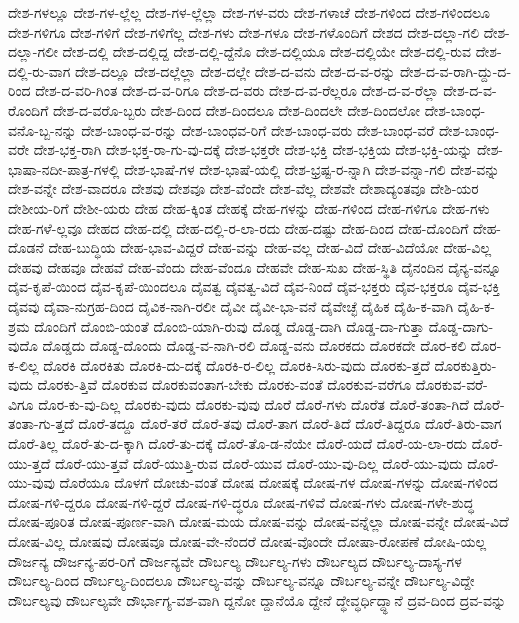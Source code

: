 {ದೇಶ-ಗಳಲ್ಲೂ
ದೇಶ-ಗಳ-ಲ್ಲೆಲ್ಲ
ದೇಶ-ಗಳ-ಲ್ಲೆಲ್ಲಾ
ದೇಶ-ಗಳ-ವರು
ದೇಶ-ಗಳಾಚೆ
ದೇಶ-ಗಳಿಂದ
ದೇಶ-ಗಳಿಂದಲೂ
ದೇಶ-ಗಳಿಗೂ
ದೇಶ-ಗಳಿಗೆ
ದೇಶ-ಗಳಿಗೆಲ್ಲ
ದೇಶ-ಗಳು
ದೇಶ-ಗಳೂ
ದೇಶ-ಗಳೊಂದಿಗೆ
ದೇಶದ
ದೇಶ-ದಲ್ಲಾ-ಗಲಿ
ದೇಶ-ದಲ್ಲಾ-ಗಲೀ
ದೇಶ-ದಲ್ಲಿ
ದೇಶ-ದಲ್ಲಿದ್ದ
ದೇಶ-ದಲ್ಲಿ-ದ್ದೆನೊ
ದೇಶ-ದಲ್ಲಿಯೂ
ದೇಶ-ದಲ್ಲಿಯೇ
ದೇಶ-ದಲ್ಲಿ-ರುವ
ದೇಶ-ದಲ್ಲಿ-ರು-ವಾಗ
ದೇಶ-ದಲ್ಲೂ
ದೇಶ-ದಲ್ಲೆಲ್ಲಾ
ದೇಶ-ದಲ್ಲೇ
ದೇಶ-ದ-ವನು
ದೇಶ-ದ-ವ-ರನ್ನು
ದೇಶ-ದ-ವ-ರಾಗಿ-ದ್ದು-ದ-ರಿಂದ
ದೇಶ-ದ-ವರಿ-ಗಿಂತ
ದೇಶ-ದ-ವ-ರಿಗೂ
ದೇಶ-ದ-ವರು
ದೇಶ-ದ-ವ-ರೆಲ್ಲರೂ
ದೇಶ-ದ-ವ-ರೆಲ್ಲಾ
ದೇಶ-ದ-ವ-ರೊಂದಿಗೆ
ದೇಶ-ದ-ವರೊ-ಬ್ಬರು
ದೇಶ-ದಿಂದ
ದೇಶ-ದಿಂದಲೂ
ದೇಶ-ದಿಂದಲೇ
ದೇಶ-ದಿಂದಲೋ
ದೇಶ-ಬಾಂಧ-ವನೊ-ಬ್ಬ-ನನ್ನು
ದೇಶ-ಬಾಂಧ-ವ-ರನ್ನು
ದೇಶ-ಬಾಂಧವ-ರಿಗೆ
ದೇಶ-ಬಾಂಧ-ವರು
ದೇಶ-ಬಾಂಧ-ವರೆ
ದೇಶ-ಬಾಂಧ-ವರೇ
ದೇಶ-ಭಕ್ತ-ರಾಗಿ
ದೇಶ-ಭಕ್ತ-ರಾ-ಗು-ವು-ದಕ್ಕೆ
ದೇಶ-ಭಕ್ತರೇ
ದೇಶ-ಭಕ್ತಿ
ದೇಶ-ಭಕ್ತಿಯ
ದೇಶ-ಭಕ್ತಿ-ಯನ್ನು
ದೇಶ-ಭಾಷಾ-ನದೀ-ಪಾತ್ರ-ಗಳಲ್ಲಿ
ದೇಶ-ಭಾಷೆ-ಗಳ
ದೇಶ-ಭಾಷೆ-ಯಲ್ಲಿ
ದೇಶ-ಭ್ರಷ್ಟ-ರ-ನ್ನಾಗಿ
ದೇಶ-ವನ್ನಾ-ಗಲಿ
ದೇಶ-ವನ್ನು
ದೇಶ-ವನ್ನೇ
ದೇಶ-ವಾದರೂ
ದೇಶವು
ದೇಶವೂ
ದೇಶ-ವೆಂದೇ
ದೇಶ-ವೆಲ್ಲ
ದೇಶವೇ
ದೇಶಾದ್ಯಂತವೂ
ದೇಶಿ-ಯರ
ದೇಶೀಯ-ರಿಗೆ
ದೇಶೀ-ಯರು
ದೇಹ
ದೇಹ-ಕ್ಕಿಂತ
ದೇಹಕ್ಕೆ
ದೇಹ-ಗಳನ್ನು
ದೇಹ-ಗಳಿಂದ
ದೇಹ-ಗಳಿಗೂ
ದೇಹ-ಗಳು
ದೇಹ-ಗಳೆ-ಲ್ಲವೂ
ದೇಹದ
ದೇಹ-ದಲ್ಲಿ
ದೇಹ-ದಲ್ಲಿ-ರ-ಲಾ-ರದು
ದೇಹ-ದಷ್ಟು
ದೇಹ-ದಿಂದ
ದೇಹ-ದೊಂದಿಗೆ
ದೇಹ-ದೊಡನೆ
ದೇಹ-ಬುದ್ಧಿಯ
ದೇಹ-ಭಾವ-ವಿದ್ದರೆ
ದೇಹ-ವನ್ನು
ದೇಹ-ವಲ್ಲ
ದೇಹ-ವಿದೆ
ದೇಹ-ವಿದೆಯೋ
ದೇಹ-ವಿಲ್ಲ
ದೇಹವು
ದೇಹವೂ
ದೇಹವೆ
ದೇಹ-ವೆಂದು
ದೇಹ-ವೆಂದೂ
ದೇಹವೇ
ದೇಹ-ಸುಖ
ದೇಹ-ಸ್ಥಿತಿ
ದೈನಂದಿನ
ದೈನ್ಯ-ವನ್ನೂ
ದೈವ-ಕೃಪೆ-ಯಿಂದ
ದೈವ-ಕೃಪೆ-ಯಿಂದಲೂ
ದೈವತ್ವ
ದೈವತ್ವ-ವಿದೆ
ದೈವ-ನಿಂದೆ
ದೈವ-ಭಕ್ತರು
ದೈವ-ಭಕ್ತರೂ
ದೈವ-ಭಕ್ತಿ
ದೈವವು
ದೈವಾ-ನುಗ್ರಹ-ದಿಂದ
ದೈವಿಕ-ನಾಗಿ-ರಲೀ
ದೈವೀ
ದೈವೀ-ಭಾ-ವನೆ
ದೈವೇಚ್ಛೆ
ದೈಹಿಕ
ದೈಹಿ-ಕ-ವಾಗಿ
ದೈಹಿ-ಕ-ಶ್ರಮ
ದೊಂದಿಗೆ
ದೊಂಬಿ-ಯಂತೆ
ದೊಂಬಿ-ಯಾಗಿ-ರುವು
ದೊಡ್ಡ
ದೊಡ್ಡ-ದಾಗಿ
ದೊಡ್ಡ-ದಾ-ಗುತ್ತಾ
ದೊಡ್ಡ-ದಾಗು-ವುದೊ
ದೊಡ್ಡದು
ದೊಡ್ಡ-ದೊಂದು
ದೊಡ್ಡ-ವ-ನಾಗಿ-ರಲಿ
ದೊಡ್ಡ-ವನು
ದೊರಕದು
ದೊರಕದೇ
ದೊರ-ಕಲಿ
ದೊರ-ಕ-ಲಿಲ್ಲ
ದೊರಕಿ
ದೊರಕಿತು
ದೊರಕಿ-ದು-ದಕ್ಕೆ
ದೊರಕಿ-ರ-ಲಿಲ್ಲ
ದೊರಕಿ-ಸಿರು-ವುದು
ದೊರಕು-ತ್ತದೆ
ದೊರಕುತ್ತಿರು-ವುದು
ದೊರಕು-ತ್ತಿವೆ
ದೊರಕುವ
ದೊರಕುವಂತಾಗ-ಬೇಕು
ದೊರಕು-ವಂತೆ
ದೊರಕುವ-ವರೆಗೂ
ದೊರಕುವ-ವರೆ-ವಿಗೂ
ದೊರ-ಕು-ವು-ದಿಲ್ಲ
ದೊರಕು-ವುದು
ದೊರಕು-ವುವು
ದೊರೆ
ದೊರೆ-ಗಳು
ದೊರೆತ
ದೊರೆ-ತಂತಾ-ಗಿದೆ
ದೊರೆ-ತಂತಾ-ಗು-ತ್ತದೆ
ದೊರೆ-ತದ್ದೂ
ದೊರೆ-ತರೆ
ದೊರೆ-ತವು
ದೊರೆ-ತಾಗ
ದೊರೆ-ತಿದೆ
ದೊರೆ-ತಿದ್ದರೂ
ದೊರೆ-ತಿರು-ವಾಗ
ದೊರೆ-ತಿಲ್ಲ
ದೊರೆ-ತು-ದ-ಕ್ಕಾಗಿ
ದೊರೆ-ತು-ದಕ್ಕೆ
ದೊರೆ-ತೊ-ಡ-ನೆಯೇ
ದೊರೆ-ಯದೆ
ದೊರೆ-ಯ-ಲಾ-ರದು
ದೊರೆ-ಯು-ತ್ತದೆ
ದೊರೆ-ಯು-ತ್ತವೆ
ದೊರೆ-ಯುತ್ತಿ-ರುವ
ದೊರೆ-ಯುವ
ದೊರೆ-ಯು-ವು-ದಿಲ್ಲ
ದೊರೆ-ಯು-ವುದು
ದೊರೆ-ಯು-ವುವು
ದೊರೆಯೂ
ದೊಳಗೆ
ದೋಚು-ವಂತೆ
ದೋಷ
ದೋಷಕ್ಕೆ
ದೋಷ-ಗಳ
ದೋಷ-ಗಳನ್ನು
ದೋಷ-ಗಳಿಂದ
ದೋಷ-ಗಳಿ-ದ್ದರೂ
ದೋಷ-ಗಳಿ-ದ್ದರೆ
ದೋಷ-ಗಳಿ-ದ್ಧರೂ
ದೋಷ-ಗಳಿವೆ
ದೋಷ-ಗಳು
ದೋಷ-ಗಳೇ-ಶುದ್ಧ
ದೋಷ-ಪೂರಿತ
ದೋಷ-ಪೂರ್ಣ-ವಾಗಿ
ದೋಷ-ಮಯ
ದೋಷ-ವನ್ನು
ದೋಷ-ವನ್ನೆಲ್ಲಾ
ದೋಷ-ವನ್ನೇ
ದೋಷ-ವಿದೆ
ದೋಷ-ವಿಲ್ಲ
ದೋಷವು
ದೋಷವೂ
ದೋಷ-ವೇ-ನೆಂದರೆ
ದೋಷ-ವೊಂದೇ
ದೋಷಾ-ರೋಪಣೆ
ದೋಷಿ-ಯಲ್ಲ
ದೌರ್ಜನ್ಯ
ದೌರ್ಜನ್ಯ-ಪರ-ರಿಗೆ
ದೌರ್ಜನ್ಯವೇ
ದೌರ್ಬಲ್ಯ
ದೌರ್ಬಲ್ಯ-ಗಳು
ದೌರ್ಬಲ್ಯದ
ದೌರ್ಬಲ್ಯ-ದಾಸ್ಯ-ಗಳ
ದೌರ್ಬಲ್ಯ-ದಿಂದ
ದೌರ್ಬಲ್ಯ-ದಿಂದಲೂ
ದೌರ್ಬಲ್ಯ-ವನ್ನು
ದೌರ್ಬಲ್ಯ-ವನ್ನೂ
ದೌರ್ಬಲ್ಯ-ವನ್ನೇ
ದೌರ್ಬಲ್ಯ-ವಿದ್ದೇ
ದೌರ್ಬಲ್ಯವು
ದೌರ್ಬಲ್ಯವೇ
ದೌರ್ಭಾಗ್ಯ-ವಶ-ವಾಗಿ
ದ್ದನೋ
ದ್ದಾನೆಯೊ
ದ್ದೇನೆ
ದ್ಧೇವ್ಧರ್ಧಿದ್ದ್ಧಾನೆ
ದ್ರವ-ದಿಂದ
ದ್ರವ-ವನ್ನು
}
